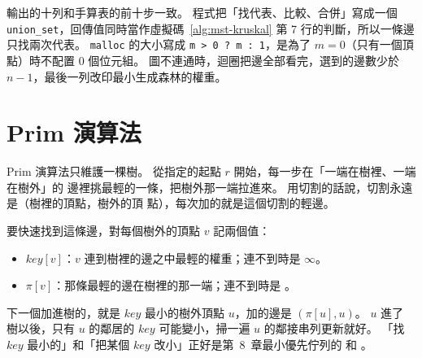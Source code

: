 
輸出的十列和手算表的前十步一致。 程式把「找代表、比較、合併」寫成一個
\texttt{union\_set}，回傳值同時當作虛擬碼~\ref{alg:mst-kruskal} 第 7 行的判斷，所以一條邊只找兩次代表。 \texttt{malloc}
的大小寫成 \texttt{m > 0 ? m : 1}，是為了 $m = 0$（只有一個頂點）時不配置 $0$ 個位元組。
圖不連通時，迴圈把邊全部看完，選到的邊數少於 $n - 1$，最後一列改印最小生成森林的權重。

\section{Prim 演算法}
\label{sec:mst-prim}

Prim 演算法只維護一棵樹。 從指定的起點 $r$ 開始，每一步在「一端在樹裡、一端在樹外」的
邊裡挑最輕的一條，把樹外那一端拉進來。 用切割的話說，切割永遠是（樹裡的頂點，樹外的頂
點），每次加的就是這個切割的輕邊。

要快速找到這條邊，對每個樹外的頂點 $v$ 記兩個值：
\begin{itemize}
\item $\mathit{key}[v]$：$v$ 連到樹裡的邊之中最輕的權重；連不到時是 $\infty$。
\item $\pi[v]$：那條最輕的邊在樹裡的那一端；連不到時是 \NIL。
\end{itemize}
下一個加進樹的，就是 $\mathit{key}$ 最小的樹外頂點 $u$，加的邊是 $(\pi[u], u)$。 $u$ 進了
樹以後，只有 $u$ 的鄰居的 $\mathit{key}$ 可能變小，掃一遍 $u$ 的鄰接串列更新就好。 「找
$\mathit{key}$ 最小的」和「把某個 $\mathit{key}$ 改小」正好是第~8~章最小優先佇列的
 和 。

